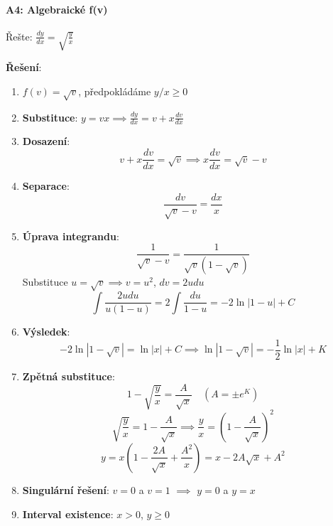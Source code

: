 \paragraph*{A4: Algebraické f(v)}

\begin{example}
Řešte: $\frac{dy}{dx} = \sqrt{\frac{y}{x}}$
\vspace{0.3\baselineskip}

\textbf{Řešení}: 
\begin{enumerate}
\item $f(v) = \sqrt{v}$, předpokládáme $y/x \geq 0$

\item \textbf{Substituce}: $y = vx \implies \frac{dy}{dx} = v + x\frac{dv}{dx}$

\item \textbf{Dosazení}:
\[
v + x\frac{dv}{dx} = \sqrt{v} \implies x\frac{dv}{dx} = \sqrt{v} - v
\]

\item \textbf{Separace}:
\[
\frac{dv}{\sqrt{v} - v} = \frac{dx}{x}
\]

\item \textbf{Úprava integrandu}:
\[
\frac{1}{\sqrt{v} - v} = \frac{1}{\sqrt{v}(1 - \sqrt{v})}
\]
Substituce $u = \sqrt{v} \implies v = u^2$, $dv = 2u  du$
\[
\int \frac{2u  du}{u(1 - u)} = 2\int \frac{du}{1 - u} = -2\ln|1 - u| + C
\]

\item \textbf{Výsledek}:
\[
-2\ln|1 - \sqrt{v}| = \ln|x| + C \implies \ln|1 - \sqrt{v}| = -\frac{1}{2}\ln|x| + K
\]

\item \textbf{Zpětná substituce}:
\[
1 - \sqrt{\frac{y}{x}} = \frac{A}{\sqrt{x}} \quad (A = \pm e^K)
\]
\[
\sqrt{\frac{y}{x}} = 1 - \frac{A}{\sqrt{x}} \implies \frac{y}{x} = \left(1 - \frac{A}{\sqrt{x}}\right)^2
\]
\[
y = x\left(1 - \frac{2A}{\sqrt{x}} + \frac{A^2}{x}\right) = x - 2A\sqrt{x} + A^2
\]

\item \textbf{Singulární řešení}: $v = 0$ a $v = 1$ $\implies$ $y = 0$ a $y = x$

\item \textbf{Interval existence}: $x > 0$, $y \geq 0$
\end{enumerate}
\end{example}

\vspace{0.6\baselineskip}

